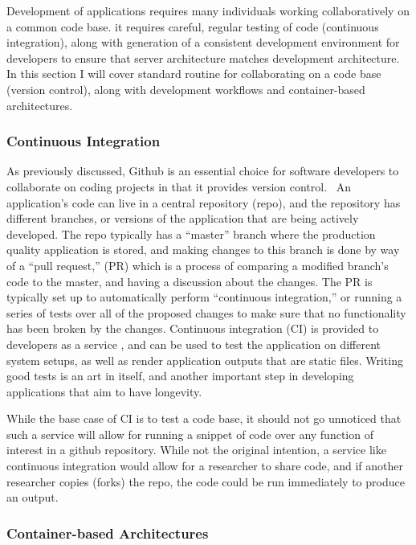 \documentclass{report}
\begin{document}
Development of applications requires many individuals working
collaboratively on a common code base. it requires careful, regular
testing of code (continuous integration), along with generation of a
consistent development environment for developers to ensure that server
architecture matches development architecture. In this section I will
cover standard routine for collaborating on a code base (version
control), along with development workflows and container-based
architectures.

\subsubsection{Continuous Integration}
As previously discussed, Github is an essential choice for software
developers to collaborate on coding projects in that it provides version
control. ~An application's code can live in a central repository (repo),
and the repository has different branches, or versions of the
application that are being actively developed. The repo typically has a
``master'' branch where the production quality application is stored,
and making changes to this branch is done by way of a ``pull request,''
(PR) which is a process of comparing a modified branch's code to the
master, and having a discussion about the changes. The PR is typically
set up to automatically perform ``continuous integration,'' or running a
series of tests over all of the proposed changes to make sure that no
functionality has been broken by the changes. Continuous integration
(CI) is provided to developers as a service \cite{noauthor_undated-nz,noauthor_undated-nm},
and can be used to test the application on different system setups, as
well as render application outputs that are static files. Writing good
tests is an art in itself, and another important step in developing
applications that aim to have longevity.

While the base case of CI is to test a code base, it should not go
unnoticed that such a service will allow for running a snippet of code
over any function of interest in a github repository. While not the
original intention, a service like continuous integration would allow
for a researcher to share code, and if another researcher copies (forks)
the repo, the code could be run immediately to produce an output. ~

\subsubsection{Container-based Architectures}
\end{document}
